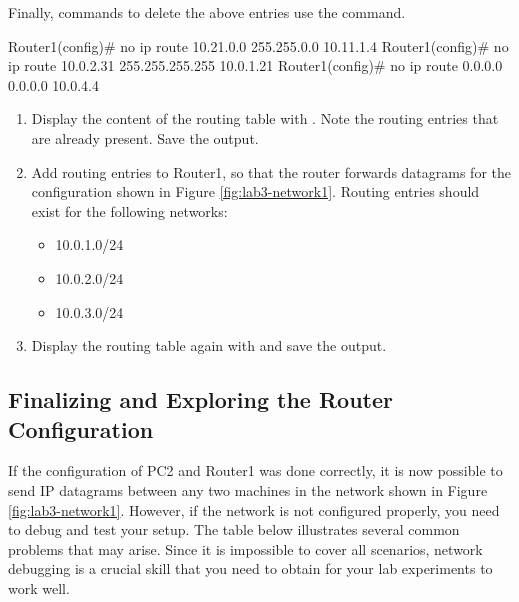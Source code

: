 Finally, commands to delete the above entries use the  command.
\begin{cmdblock}
	Router1(config)# no ip route 10.21.0.0 255.255.0.0 10.11.1.4 
	Router1(config)# no ip route 10.0.2.31 255.255.255.255 10.0.1.21 
	Router1(config)# no ip route 0.0.0.0 0.0.0.0 10.0.4.4
\end{cmdblock}

\begin{enumerate}
	\item Display the content of the routing table with . Note the routing entries that are already present. Save the output.
	\item Add routing entries to Router1, so that the router forwards datagrams for the configuration shown in Figure \ref{fig:lab3-network1}. Routing entries should exist for the following networks:
		\begin{itemize}
			\item 10.0.1.0/24
			\item 10.0.2.0/24
			\item 10.0.3.0/24
		\end{itemize}
	\item Display the routing table again with  and save the output.
\end{enumerate}

\begin{questions}	
\end{questions}

\newpage
\subsection{Finalizing and Exploring the Router Configuration}
If the configuration of PC2 and Router1 was done correctly, it is now possible to send IP datagrams between any two machines in the network shown in Figure \ref{fig:lab3-network1}. However, if the network is not configured properly, you need to debug and test your setup. The table below illustrates several common problems that may arise. Since it is impossible to cover all scenarios, network debugging is a crucial skill that you need to obtain for your lab experiments to work well.

